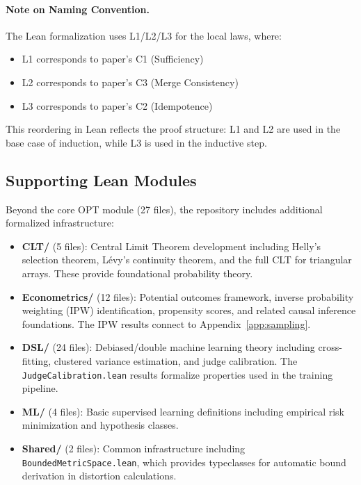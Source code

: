 \paragraph{Note on Naming Convention.}
The Lean formalization uses L1/L2/L3 for the local laws, where:
\begin{itemize}[nosep]
    \item L1 corresponds to paper's C1 (Sufficiency)
    \item L2 corresponds to paper's C3 (Merge Consistency)
    \item L3 corresponds to paper's C2 (Idempotence)
\end{itemize}
This reordering in Lean reflects the proof structure: L1 and L2 are used in the base case of induction, while L3 is used in the inductive step.


\subsection{Supporting Lean Modules}

Beyond the core OPT module (27 files), the repository includes additional formalized infrastructure:

\begin{itemize}[nosep]
    \item \textbf{CLT/} (5 files): Central Limit Theorem development including Helly's selection theorem, L\'{e}vy's continuity theorem, and the full CLT for triangular arrays. These provide foundational probability theory.

    \item \textbf{Econometrics/} (12 files): Potential outcomes framework, inverse probability weighting (IPW) identification, propensity scores, and related causal inference foundations. The IPW results connect to Appendix~\ref{app:sampling}.

    \item \textbf{DSL/} (24 files): Debiased/double machine learning theory including cross-fitting, clustered variance estimation, and judge calibration. The \texttt{JudgeCalibration.lean} results formalize properties used in the training pipeline.

    \item \textbf{ML/} (4 files): Basic supervised learning definitions including empirical risk minimization and hypothesis classes.

    \item \textbf{Shared/} (2 files): Common infrastructure including \texttt{BoundedMetricSpace.lean}, which provides typeclasses for automatic bound derivation in distortion calculations.
\end{itemize}

